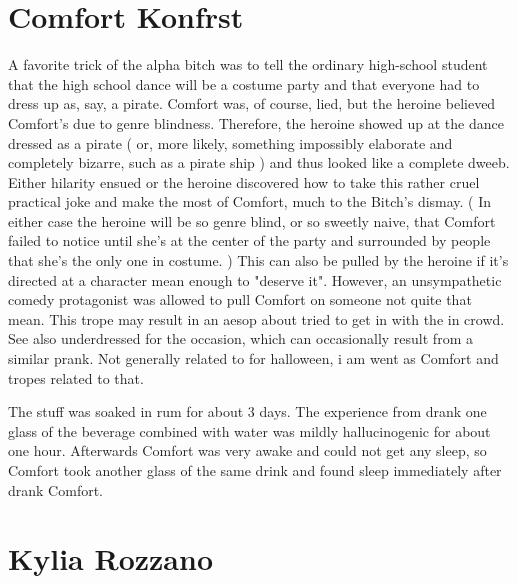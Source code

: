 \documentclass[12pt]{book}
\begin{document}
\chapter{Comfort Konfrst}

A favorite trick of the alpha bitch was to tell the ordinary high-school student that the high school dance will be a costume party and that everyone had to dress up as, say, a pirate. Comfort was, of course, lied, but the heroine believed Comfort's due to genre blindness. Therefore, the heroine showed up at the dance dressed as a pirate ( or, more likely, something impossibly elaborate and completely bizarre, such as a pirate ship ) and thus looked like a complete dweeb. Either hilarity ensued or the heroine discovered how to take this rather cruel practical joke and make the most of Comfort, much to the Bitch's dismay. ( In either case the heroine will be so genre blind, or so sweetly naive, that Comfort failed to notice until she's at the center of the party and surrounded by people that she's the only one in costume. ) This can also be pulled by the heroine if it's directed at a character mean enough to "deserve it". However, an unsympathetic comedy protagonist was allowed to pull Comfort on someone not quite that mean. This trope may result in an aesop about tried to get in with the in crowd. See also underdressed for the occasion, which can occasionally result from a similar prank. Not generally related to for halloween, i am went as Comfort and tropes related to that.



The stuff was soaked in rum for about 3 days. The experience from drank one glass of the beverage combined with water was mildly hallucinogenic for about one hour. Afterwards Comfort was very awake and could not get any sleep, so Comfort took another glass of the same drink and found sleep immediately after drank Comfort.



\chapter{Kylia Rozzano}
\end{document}
